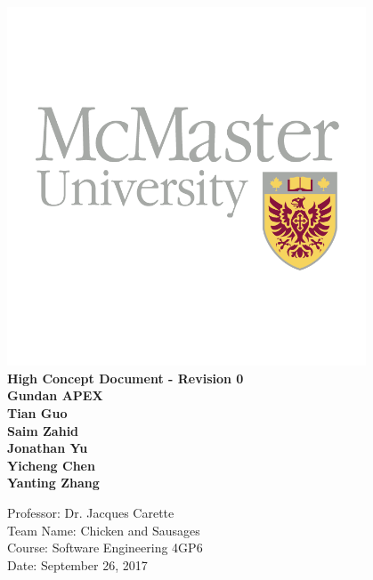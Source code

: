 \documentclass{article}
\begin{document}

\begin{titlepage}
    \begin{center}
        \vspace*{1cm}
        \includegraphics[width=0.8\textwidth]{logo.jpg}
        \\
        \textbf{\Large High Concept Document - Revision 0}
        \vspace{0.5cm}
        \textbf{\Large  \\Gundan APEX}
        \vspace{1cm}
        \textbf{\\Tian Guo\\Saim Zahid\\Jonathan Yu\\ Yicheng Chen \\Yanting Zhang }
        \vfill
        \vspace{0.8cm}
        \begin{flushright}
        Professor: Dr. Jacques Carette\\
        Team Name: Chicken and Sausages\\
        Course: Software Engineering 4GP6\\
        Date: September 26, 2017
        \end{flushright}
    \end{center}
\end{titlepage}
\end{document}
